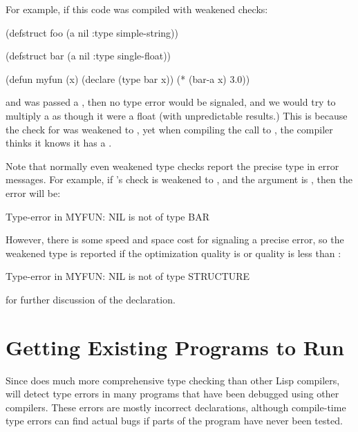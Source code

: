 For example, if this code was compiled with weakened checks:

\begin{lisp}
(defstruct foo
  (a nil :type simple-string))

(defstruct bar
  (a nil :type single-float))

(defun myfun (x)
  (declare (type bar x))
  (* (bar-a x) 3.0))
\end{lisp}

and  was passed a , then no type error would be
signaled, and we would try to multiply a  as
though it were a float (with unpredictable results.)  This is because
the check for  was weakened to , yet when
compiling the call to , the compiler thinks it knows it
has a .

Note that normally even weakened type checks report the precise type
in error messages.  For example, if 's  check is
weakened to , and the argument is \false{}, then the
error will be:

\begin{example}
Type-error in MYFUN:
  NIL is not of type BAR
\end{example}

However, there is some speed and space cost for signaling a precise
error, so the weakened type is reported if the 
optimization quality is  or  quality is less than
:

\begin{example}
Type-error in MYFUN:
  NIL is not of type STRUCTURE
\end{example}

 for further discussion of the
 declaration.


\section{Getting Existing Programs to Run}

Since \python{} does much more comprehensive type checking than other
Lisp compilers, \python{} will detect type errors in many programs
that have been debugged using other compilers.  These errors are
mostly incorrect declarations, although compile-time type errors can
find actual bugs if parts of the program have never been tested.

